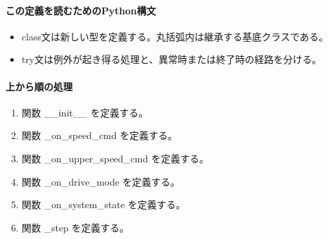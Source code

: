 \documentclass[a4paper,11pt]{article}
\begin{document}
            \paragraph{この定義を読むためのPython構文}
            \begin{itemize}[leftmargin=1.6em]
            \item class文は新しい型を定義する。丸括弧内は継承する基底クラスである。
\item try文は例外が起き得る処理と、異常時または終了時の経路を分ける。
            \end{itemize}
            \paragraph{上から順の処理}
            \begin{enumerate}[leftmargin=1.8em]
            \item 関数 \_\_init\_\_ を定義する。
\item 関数 \_on\_speed\_cmd を定義する。
\item 関数 \_on\_upper\_speed\_cmd を定義する。
\item 関数 \_on\_drive\_mode を定義する。
\item 関数 \_on\_system\_state を定義する。
\item 関数 \_step を定義する。
            \end{enumerate}
\end{document}
